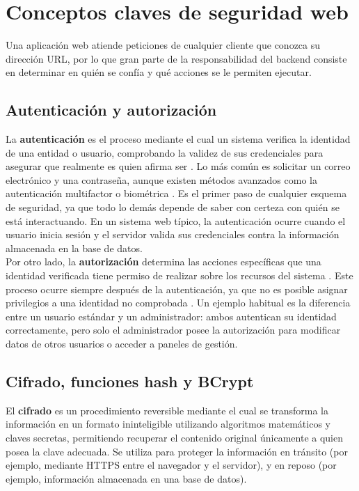 	
	\section{Conceptos claves de seguridad web}
	Una aplicaci\'on web atiende peticiones de cualquier cliente que conozca su direcci\'on URL, por lo que gran parte de la responsabilidad del backend consiste en determinar en qui\'en se conf\'ia y qu\'e acciones se le permiten ejecutar.
	
	\subsection{Autenticaci\'on y autorizaci\'on}
	La \textbf{autenticaci\'on} es el proceso mediante el cual un sistema verifica la identidad de una entidad o usuario, comprobando la validez de sus credenciales para asegurar que realmente es quien afirma ser \cite{owasp_auth}. Lo m\'as com\'un es solicitar un correo electr\'onico y una contraseña, aunque existen m\'etodos avanzados como la autenticaci\'on multifactor o biom\'etrica \cite{owasp_auth}. Es el primer paso de cualquier esquema de seguridad, ya que todo lo dem\'as depende de saber con certeza con qui\'en se est\'a interactuando. En un sistema web t\'ipico, la autenticaci\'on ocurre cuando el usuario inicia sesi\'on y el servidor valida sus credenciales contra la informaci\'on almacenada en la base de datos. \\
	
	Por otro lado, la \textbf{autorizaci\'on} determina las acciones espec\'ificas que una identidad verificada tiene permiso de realizar sobre los recursos del sistema \cite{owasp_authz}. Este proceso ocurre siempre despu\'es de la autenticaci\'on, ya que no es posible asignar privilegios a una identidad no comprobada \cite{owasp_authz}. Un ejemplo habitual es la diferencia entre un usuario est\'andar y un administrador: ambos autentican su identidad correctamente, pero solo el administrador posee la autorizaci\'on para modificar datos de otros usuarios o acceder a paneles de gesti\'on.
	
	\subsection{Cifrado, funciones hash y BCrypt}
	El \textbf{cifrado} es un procedimiento reversible mediante el cual se transforma la informaci\'on en un formato ininteligible utilizando algoritmos matem\'aticos y claves secretas, permitiendo recuperar el contenido original \'unicamente a quien posea la clave adecuada. Se utiliza para proteger la informaci\'on en tr\'ansito (por ejemplo, mediante HTTPS entre el navegador y el servidor), y en reposo (por ejemplo, informaci\'on almacenada en una base de datos). \\
	
